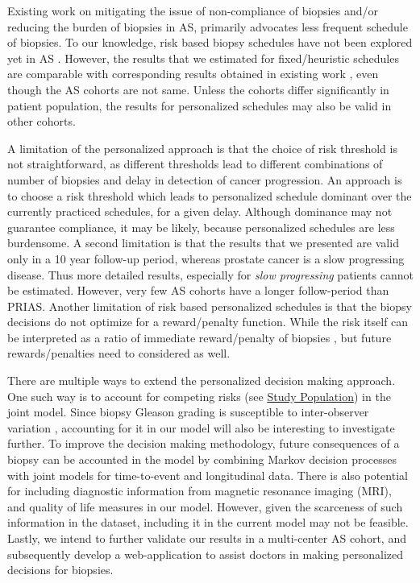 Existing work on mitigating the issue of non-compliance of biopsies and/or reducing the burden of biopsies in AS, primarily advocates less frequent schedule of biopsies. To our knowledge, risk based biopsy schedules have not been explored yet in AS \cite{nieboer2018active}. However, the results that we estimated for fixed/heuristic schedules are comparable with corresponding results obtained in existing work \cite{inoue2018comparative}, even though the AS cohorts are not same. Unless the cohorts differ significantly in patient population, the results for personalized schedules may also be valid in other cohorts. 

A limitation of the personalized approach is that the choice of risk threshold is not straightforward, as different thresholds lead to different combinations of number of biopsies and delay in detection of cancer progression. An approach is to choose a risk threshold which leads to personalized schedule dominant over the currently practiced schedules, for a given delay. Although dominance may not guarantee compliance, it may be likely, because personalized schedules are less burdensome. A second limitation is that the results that we presented are valid only in a 10 year follow-up period, whereas prostate cancer is a slow progressing disease. Thus more detailed results, especially for \textit{slow progressing} patients cannot be estimated. However, very few AS cohorts have a longer follow-period than PRIAS. Another limitation of risk based personalized schedules is that the biopsy decisions do not optimize for a reward/penalty function. While the risk itself can be interpreted as a ratio of immediate reward/penalty of biopsies \cite{vickers2006decision}, but future rewards/penalties need to considered as well.

There are multiple ways to extend the personalized decision making approach. One such way is to account for competing risks (see \hyperref[subsec:study_population]{Study Population}) in the joint model. Since biopsy Gleason grading is susceptible to inter-observer variation \cite{Gleason_interobs_var}, accounting for it in our model will also be interesting to investigate further. To improve the decision making methodology, future consequences of a biopsy can be accounted in the model by combining Markov decision processes with joint models for time-to-event and longitudinal data. There is also potential for including diagnostic information from magnetic resonance imaging (MRI), and quality of life measures in our model. However, given the scarceness of such information in the dataset, including it in the current model may not be feasible. Lastly, we intend to further validate our results in a multi-center AS cohort, and subsequently develop a web-application to assist doctors in making personalized decisions for biopsies.